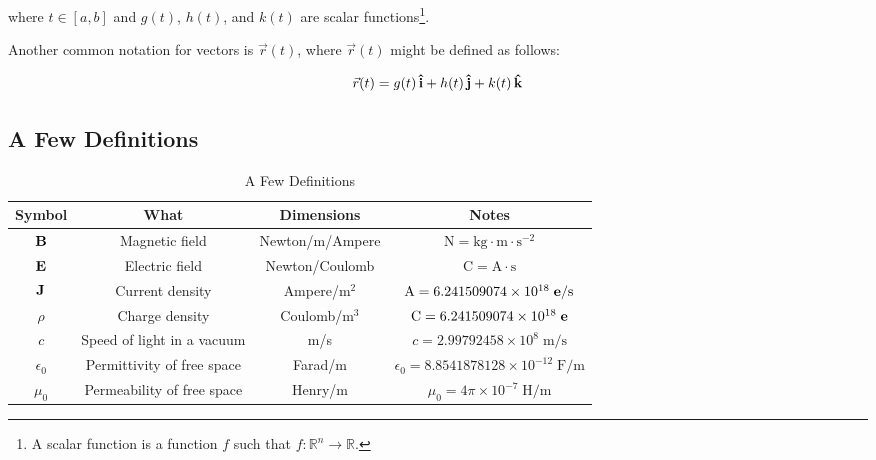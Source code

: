 \documentclass{article}
\theoremstyle{definition}
\begin{document}
\bigskip
\noindent
where $t \in [a,b]$ and $g(t)$, $h(t)$, and $k(t)$ are scalar
functions\footnote{A scalar function is a function $f$ such that
$f: \mathbb{R}^n \to \mathbb{R}$.}.


\bigskip
\noindent
Another common notation for vectors is $\vec{r}(t)$, where
$\vec{r}(t)$ might be defined as follows:


\bigskip
\begin{equation*}
\vec{r}(t) = g(t) \, \mathbf{\hat{i}} +h(t) \, \mathbf{\hat{j}} + k(t) \, \mathbf{\hat{k}} 
\end{equation*}

\subsection{A Few Definitions}
\label{subsec:a_few_definitions}

\begin{table} [H]
  \centering                                                                                    %
  \renewcommand{\arraystretch}{2.5}                                                             %
  \resizebox{0.80 \textwidth}{!} {                                                              %
     \begin{tabular} {| c | c  | c | c |}
      \hline
      {\Large \bf Symbol} & {\Large \bf What} & {\Large \bf Dimensions} & {\Large \bf Notes} \\
      \hline \hline
      $\mathbf{B}$        & Magnetic field             & Newton/m/Ampere       & $\text{N} = \text{kg} \cdot \text{m}
                                                                                \cdot \text{s}^{-2}$ \\ 
      \hline
      $\mathbf{E}$        & Electric field             & Newton/Coulomb        & $\text{C} = \text{A} \cdot \text{s}$ \\ 
      \hline
      $\mathbf{J}$        & Current density            & Ampere/$\text{m}^2$   & $\text{A} = 6.241509074 \times 10^{18} \; 
      																			\text{\bf e}/\text{s}$ \\
      \hline
      $\rho$       & Charge density             & Coulomb/$\text{m}^3$  & $\text{C} = 6.241509074 \times 10^{18} \; 
      																			\text{\bf e}$ \\ 
      \hline
      $c$          & Speed of light in a vacuum & m/s                   & $c = 2.99792458 \times 10^{8} \; \text{m/s}$ \\
      \hline
      $\epsilon_0$ & Permittivity of free space & Farad/m               & $\epsilon_0 = 8.8541878128 \times 10^{-12} \; \text{F/m}$ \\
      \hline
      $\mu_0$      & Permeability of free space & Henry/m               & $\mu_0 = 4\pi \times 10^{-7} \; \text{H/m}$ \\
      \hline
    \end{tabular}
   }                                                                    %
  \caption{A Few Definitions}
  \label{tab:definitions}
\end{table}
\end{document}
